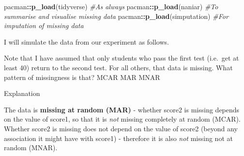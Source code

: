 \documentclass[
]{book}
\newenvironment{Shaded}{\begin{snugshade}}{\end{snugshade}}
\newcommand{\CommentTok}[1]{\textcolor[rgb]{0.56,0.35,0.01}{\textit{#1}}}
\newcommand{\DataTypeTok}[1]{\textcolor[rgb]{0.13,0.29,0.53}{#1}}
\newcommand{\DecValTok}[1]{\textcolor[rgb]{0.00,0.00,0.81}{#1}}
\newcommand{\KeywordTok}[1]{\textcolor[rgb]{0.13,0.29,0.53}{\textbf{#1}}}
\newcommand{\NormalTok}[1]{#1}
\newcommand{\OperatorTok}[1]{\textcolor[rgb]{0.81,0.36,0.00}{\textbf{#1}}}
\newcommand{\OtherTok}[1]{\textcolor[rgb]{0.56,0.35,0.01}{#1}}
\newcommand{\StringTok}[1]{\textcolor[rgb]{0.31,0.60,0.02}{#1}}
\begin{document}
\begin{Shaded}
\begin{Highlighting}[]
\NormalTok{pacman}\OperatorTok{::}\KeywordTok{p_load}\NormalTok{(tidyverse) }\CommentTok{#As always}
\NormalTok{pacman}\OperatorTok{::}\KeywordTok{p_load}\NormalTok{(naniar) }\CommentTok{#To summarise and visualise missing data}
\NormalTok{pacman}\OperatorTok{::}\KeywordTok{p_load}\NormalTok{(simputation) }\CommentTok{#For imputation of missing data}
\end{Highlighting}
\end{Shaded}

I will simulate the data from our experiment as follows.

\begin{Shaded}
\end{Shaded}

Note that I have assumed that only students who pass the first test (i.e.~get at least 40) return to the second test. For all others, that data is missing. What pattern of missingness is that? MCAR MAR MNAR

Explanation

The data is \textbf{missing at random (MAR)} - whether score2 is missing depends on the value of score1, so that it is \emph{not} missing completely at random (MCAR). Whether score2 is missing does not depend on the value of score2 (beyond any association it might have with score1) - therefore it is also \emph{not} missing not at random (MNAR).
\end{document}
